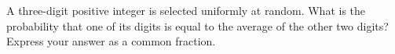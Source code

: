 A three-digit positive integer is selected uniformly at random. What is the probability that one of its digits is equal to the average of the other two digits? Express your answer as a common fraction.

